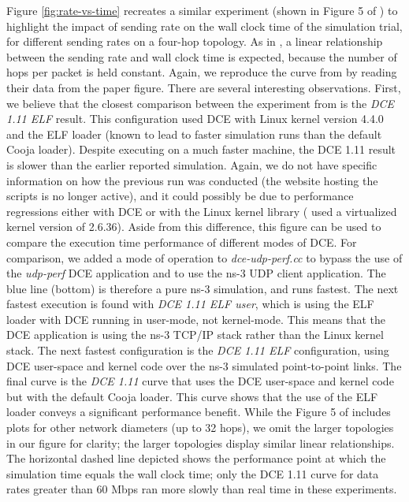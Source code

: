 \documentclass{sig-alternate}
\begin{document}
Figure \ref{fig:rate-vs-time} recreates a similar experiment 
(shown in Figure 5 of \cite{Tazaki13}) to highlight the impact of sending
rate on the wall clock time of the simulation trial, for different sending
rates on a four-hop topology.  As in \cite{Tazaki13}, a linear relationship
between the sending rate and wall clock time is expected, because the
number of hops per packet is held constant.  Again, we reproduce the
curve from \cite{Tazaki13} by reading their data from the paper figure.
There are several interesting observations.  First, we believe that the
closest comparison between the experiment from \cite{Tazaki13} is the
\emph{DCE 1.11 ELF} result.  This configuration used DCE with Linux kernel
version 4.4.0 and the ELF loader (known to lead to faster simulation
runs than the default Cooja loader).  Despite executing on a much faster
machine, the DCE 1.11 result is slower than the earlier reported simulation.
Again, we do not have specific information on how the previous run
was conducted (the website hosting the scripts is no longer active), and
it could possibly be due to performance regressions either with DCE
or with the Linux kernel library (\cite{Tazaki13} used a virtualized kernel
version of 2.6.36).  Aside from this difference, this figure can be used
to compare the execution time performance of different modes of DCE.
For comparison, we added a mode of operation to \emph{dce-udp-perf.cc} to
bypass the use of the \emph{udp-perf} DCE application and to use the
ns-3 UDP client application.  The blue line (bottom) is therefore a pure
ns-3 simulation, and runs fastest.  The next fastest execution is found
with \emph{DCE 1.11 ELF user}, which is using the ELF loader with DCE
running in user-mode, not kernel-mode.  This means that the DCE application
is using the ns-3 TCP/IP stack rather than the Linux kernel stack.  The
next fastest configuration is the \emph{DCE 1.11 ELF} configuration, using
DCE user-space and kernel code over the ns-3 simulated point-to-point links.
The final curve is the \emph{DCE 1.11} curve that uses the DCE user-space
and kernel code but with the default Cooja loader.  This curve shows that
the use of the ELF loader conveys a significant performance benefit.
While the Figure 5 of \cite{Tazaki13} includes plots for other network
diameters (up to 32 hops), we omit the larger topologies in our figure
for clarity; the larger topologies display similar linear relationships.
The horizontal dashed line depicted shows the performance point at which
the simulation time equals the wall clock time; only the DCE 1.11 curve
for data rates greater than 60 Mbps ran more slowly than real time in
these experiments.
\end{document}
